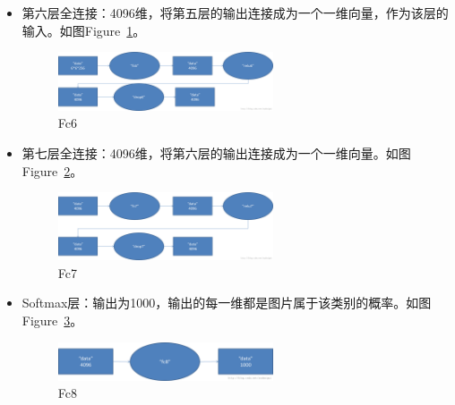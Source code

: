 \documentclass[12pt]{article}
\begin{document}
\begin{itemize}
\item 第六层全连接：4096维，将第五层的输出连接成为一个一维向量，作为该层的输入。如图Figure~\ref{fig:fc6}。
	\begin{figure}[!ht]
	\centering
	\includegraphics[width=0.6\textwidth]{fc1}
	\caption{Fc6}
	\label{fig:fc6}
	\end{figure}
\item 第七层全连接：4096维，将第六层的输出连接成为一个一维向量。如图Figure~\ref{fig:fc7}。
	\begin{figure}[!ht]
	\centering
	\includegraphics[width=0.6\textwidth]{fc2}
	\caption{Fc7}
	\label{fig:fc7}
	\end{figure}
\item Softmax层：输出为1000，输出的每一维都是图片属于该类别的概率。如图Figure~\ref{fig:fc8}。
	\begin{figure}[!ht]
	\centering
	\includegraphics[width=0.6\textwidth]{fc3}
	\caption{Fc8}
	\label{fig:fc8}
	\end{figure}
\end{itemize}




\end{document}
